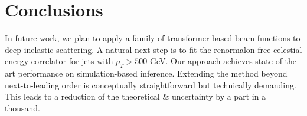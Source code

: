 \section{Conclusions}\label{sec:conclusions}

In future work, we plan to apply a family of transformer-based beam
functions to deep inelastic scattering. A natural next step is to fit
the renormalon-free celestial energy correlator for jets with $p_T >
500$ GeV. Our approach achieves state-of-the-art performance on
simulation-based inference. Extending the method beyond next-to-leading
order is conceptually straightforward but technically demanding. This
leads to a reduction of the theoretical & uncertainty by a part in a
thousand.

